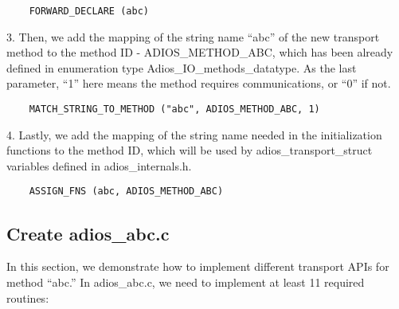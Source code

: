 \begin{lstlisting}
    FORWARD_DECLARE (abc)
\end{lstlisting}

3. Then, we add the mapping of the string name ``abc'' of the new transport method 
to the method ID - ADIOS\_METHOD\_ABC, which has been already defined in enumeration 
type Adios\_IO\_methods\_datatype. As the last parameter, ``1'' here means the 
method requires communications, or ``0'' if not.

\begin{lstlisting}
    MATCH_STRING_TO_METHOD ("abc", ADIOS_METHOD_ABC, 1)     
\end{lstlisting}
        
4. Lastly, we add the mapping of the string name needed in the initialization functions 
to the method ID, which will be used by adios\_transport\_struct variables defined 
in adios\_internals.h.

\begin{lstlisting}
    ASSIGN_FNS (abc, ADIOS_METHOD_ABC)
\end{lstlisting}

\subsection{Create adios\_abc.c}

In this section, we demonstrate how to implement different transport APIs for method 
``abc.'' In adios\_abc.c, we need to implement at least 11 required routines: 

